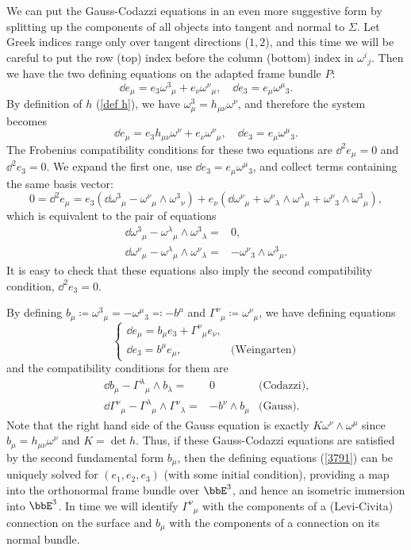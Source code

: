 \begin{rem}
    We can put the Gauss-Codazzi equations in an even more suggestive form by splitting up the components of all objects into tangent and normal to $\Sigma$. Let Greek indices range only over tangent directions ($1,2$), and this time we will be careful to put the row (top) index before the column (bottom) index in $\omega^i{}_j$. Then we have the two defining equations on the adapted frame bundle $P$:
    \[\dd e_\mu=e_3\omega^3{}_\mu + e_\nu\omega^\nu{}_\mu,\quad \dd e_3=e_\mu\omega^\mu{}_3.\]
    By definition of $h$ (\ref{def h}), we have $\omega^3_\mu=h_{\mu\nu}\omega^\nu$, and therefore the system becomes 
    \[\dd e_\mu= e_3 h_{\mu\nu}\omega^\nu+ e_\nu\omega^\nu{}_\mu ,\quad \dd e_3=e_\mu\omega^\mu{}_3.\]
    The Frobenius compatibility conditions for these two equations are $\dd^2 e_\mu=0$ and $\dd^2 e_3=0$. We expand the first one, use $\dd e_3=e_\mu\omega^\mu{}_3$, and collect terms containing the same basis vector:
    \[0=\dd^2e_\mu=e_3\left(\dd \omega^3{}_\mu-\omega^\nu{}_\mu\wedge\omega^3{}_\nu\right)
    +e_\nu\left(\dd\omega^\nu{}_\mu+\omega^\nu{}_\lambda\wedge\omega^\lambda{}_\mu+\omega^\nu{}_3\wedge\omega^3{}_\mu\right),
    \]
    which is equivalent to the pair of equations 
    \begin{align}
        \dd\omega^3{}_\mu-\omega^\lambda{}_\mu\wedge\omega^3{}_\lambda=&0,\\
        \dd\omega^\nu{}_\mu-\omega^\lambda{}_\mu\wedge\omega^\nu{}_\lambda=&-\omega^\nu{}_3\wedge \omega^3{}_\mu.
    \end{align}
    It is easy to check that these equations also imply the second compatibility condition, $\dd^2 e_3=0$. 
    
    By defining $b_\mu\coloneqq \omega^3{}_\mu=-\omega^\mu{}_3\eqqcolon-b^\mu$ and $\Gamma^\nu{}_\mu\coloneqq \omega^\nu{}_\mu$, we have defining equations
    \[\begin{cases}
        \dd e_\mu=b_\mu e_3+\Gamma^\nu{}_\mu e_\nu, &\\
        \dd e_3=b^\mu e_\mu, &\text{(Weingarten)}
    \end{cases}\label{3791}\]
    and the compatibility conditions for them are
    \begin{align}
        \dd b_\mu-\Gamma^\lambda{}_\mu \wedge b_\lambda=&0 &\text{(Codazzi),}\\
        \dd \Gamma^\nu{}_\mu-\Gamma^\lambda{}_\mu\wedge\Gamma^\nu{}_\lambda=&-b^\nu\wedge b_\mu &\text{(Gauss).}
    \end{align}
    Note that the right hand side of the Gauss equation is exactly $K \omega^\nu\wedge\omega^\mu$ since $b_\mu=h_{\mu\nu}\omega^\nu$ and $K=\det h$. Thus, if these Gauss-Codazzi equations are satisfied by the second fundamental form $b_\mu$, then the defining equations (\ref{3791}) can be uniquely solved for $(e_1,e_2,e_3)$ (with some initial condition), providing a map into the orthonormal frame bundle over $\bbE^3$, and hence an isometric immersion into $\bbE^3$. In time we will identify $\Gamma^\nu{}_\mu$ with the components of a (Levi-Civita) connection on the surface and $b_\mu$ with the components of a connection on its normal bundle.
\end{rem}
